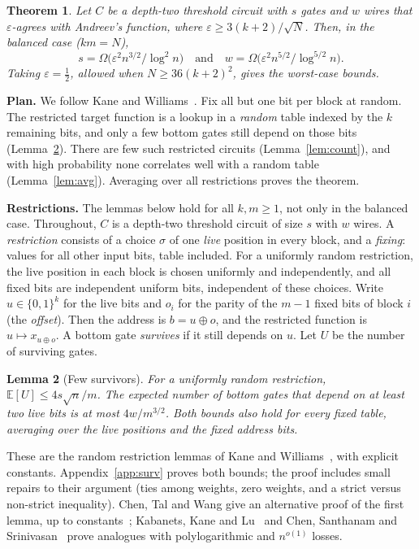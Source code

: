 \documentclass[11pt,letterpaper]{article}
\newtheorem{theorem}{Theorem}
\newtheorem{lemma}[theorem]{Lemma}
\theoremstyle{remark}
\newcommand{\bits}{\{0,1\}}
\newcommand{\smalltitle}[1]{\textbf{\color{ink}#1}\quad}
\begin{document}
\begin{theorem}\label{thm:lower}
Let $C$ be a depth-two threshold circuit with $s$
gates and $w$ wires that $\varepsilon$-agrees with Andreev's function, where
$\varepsilon\ge3(k+2)/\sqrt N$. Then, in the balanced case ($km=N$),
\[
s=\Omega\bigl(\varepsilon^2n^{3/2}/\log^2n\bigr)
\quad\text{and}\quad
w=\Omega\bigl(\varepsilon^2n^{5/2}/\log^{5/2}n\bigr).
\]
Taking $\varepsilon=\tfrac12$,
allowed when $N\ge36(k+2)^2$, gives the worst-case bounds.
\end{theorem}

\smalltitle{Plan.}
We follow Kane and Williams~\cite{KW}. Fix all but one bit per block at
random. The restricted target function is a lookup in a \emph{random} table
indexed by the $k$ remaining bits, and only a few bottom gates still depend
on those bits (Lemma~\ref{lem:surv}). There are few such restricted circuits
(Lemma~\ref{lem:count}), and with high probability none correlates well with a random
table (Lemma~\ref{lem:avg}). Averaging over all restrictions proves the
theorem.

\smalltitle{Restrictions.}
The lemmas below hold for all $k,m\ge1$, not only in the balanced case.
Throughout, $C$ is a depth-two threshold circuit of size $s$ with $w$ wires.
A \emph{restriction} consists of a choice $\sigma$ of one \emph{live}
position in every block, and a \emph{fixing}: values for all other input
bits, table included. For a uniformly random restriction, the live position
in each block is
chosen uniformly and independently, and all fixed bits are independent
uniform bits, independent of these choices. Write $u\in\bits^k$ for the
live bits and
$o_i$ for the parity of the $m-1$ fixed bits of block $i$ (the
\emph{offset}). Then the address is $b=u\oplus o$, and the restricted
function is $u\mapsto x_{u\oplus o}$. A bottom gate \emph{survives} if it
still depends on $u$. Let $U$ be the number of surviving gates.

\begin{lemma}[Few survivors]\label{lem:surv}
For a uniformly random restriction, $\mathbb E[U]\le4s\sqrt n/m$. The
expected number of bottom gates that depend on at least two live bits is at
most $4w/m^{3/2}$. Both bounds also hold for every fixed table, averaging
over the live
positions and the fixed address bits.
\end{lemma}
These are the random restriction lemmas of Kane and
Williams~\cite[Lemmas~1.1 and~3.1]{KW}, with explicit constants.
Appendix~\ref{app:surv} proves both bounds; the proof includes small repairs
to their argument (ties among weights, zero weights, and a strict
versus non-strict inequality). Chen, Tal and Wang give an alternative proof
of the first lemma, up to constants~\cite[App.~A.3]{CTW}; Kabanets, Kane and
Lu~\cite[Lemma~6.1]{KKL} and Chen, Santhanam and
Srinivasan~\cite[Lemma~9.1]{CSS} prove analogues with polylogarithmic and
$n^{o(1)}$ losses.
\end{document}
